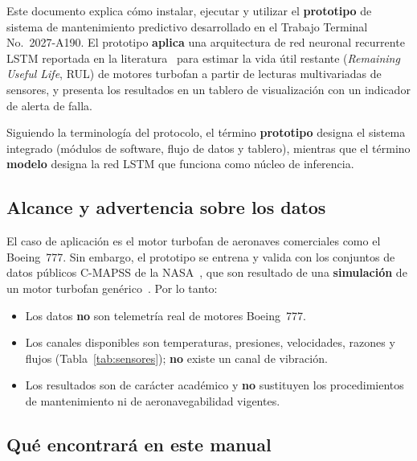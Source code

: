 \documentclass[letterpaper]{article}
\begin{document}
Este documento explica cómo instalar, ejecutar y utilizar el \textbf{prototipo}
de sistema de mantenimiento predictivo desarrollado en el Trabajo Terminal
No.~2027-A190. El prototipo \textbf{aplica} una arquitectura de red neuronal
recurrente LSTM reportada en la literatura~\cite{zheng2017lstm} para estimar la
vida útil restante (\textit{Remaining Useful Life}, RUL) de motores turbofan a
partir de lecturas multivariadas de sensores, y presenta los resultados en un
tablero de visualización con un indicador de alerta de falla.

Siguiendo la terminología del protocolo, el término \textbf{prototipo} designa
el sistema integrado (módulos de software, flujo de datos y tablero), mientras
que el término \textbf{modelo} designa la red LSTM que funciona como núcleo de
inferencia.

\subsection{Alcance y advertencia sobre los datos}

El caso de aplicación es el motor turbofan de aeronaves comerciales como el
Boeing~777. Sin embargo, el prototipo se entrena y valida con los conjuntos de
datos públicos C-MAPSS de la NASA~\cite{saxena2008damage}, que son resultado de
una \textbf{simulación} de un motor turbofan genérico~\cite{frederick2007cmapss}.
Por lo tanto:

\begin{itemize}
    \item Los datos \textbf{no} son telemetría real de motores Boeing~777.
    \item Los canales disponibles son temperaturas, presiones, velocidades,
          razones y flujos (Tabla~\ref{tab:sensores}); \textbf{no} existe un canal
          de vibración.
    \item Los resultados son de carácter académico y \textbf{no} sustituyen los
          procedimientos de mantenimiento ni de aeronavegabilidad vigentes.
\end{itemize}

\subsection{Qué encontrará en este manual}
\end{document}
